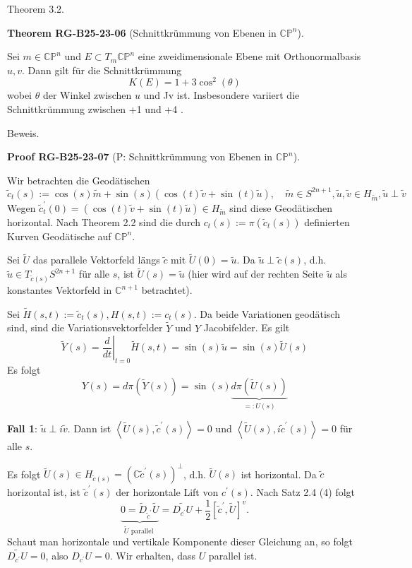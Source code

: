 \documentclass[10pt, letterpaper]{article}
\newcommand{\CustomHeading}[3]{%
  \par\medskip\noindent%
  \textbf{#1 #2} \textnormal{(#3)}.\enskip%
}
\newenvironment{THEO}[2]{\begin{unitbox}\CustomHeading{Theorem}{#1}{#2}}{\end{unitbox}}
\newenvironment{PROOF}[2]{\begin{unitbox}\CustomHeading{Proof}{#1}{#2}}{\end{unitbox}}
\begin{document}
Theorem 3.2. 


\begin{THEO}{RG-B25-23-06}{Schnittkrümmung von Ebenen in $\mathbb{C P}^{n}$}
Sei $m \in \mathbb{C P}^{n}$ und $E \subset T_{m} \mathbb{C P}^{n}$ eine zweidimensionale Ebene mit Orthonormalbasis $u, v$. Dann gilt für die Schnittkrümmung
$$
K(E)=1+3 \cos ^{2}(\theta)
$$
wobei $\theta$ der Winkel zwischen $u$ und Jv ist. Insbesondere variiert die Schnittkrümmung zwischen +1 und +4 .
\end{THEO}



Beweis. 

\begin{PROOF}{RG-B25-23-07}{P: Schnittkrümmung von Ebenen in $\mathbb{C P}^{n}$}
Wir betrachten die Geodätischen
$$\tilde{c}_{t}(s):=\cos (s) \tilde{m}+\sin (s)(\cos (t) \tilde{v}+\sin (t) \tilde{u}), \quad \tilde{m} \in S^{2 n+1}, \tilde{u}, \tilde{v} \in H_{\tilde{m}}, \tilde{u} \perp \tilde{v}$$
Wegen $\tilde{c}_{t}^{\prime}(0)=(\cos (t) \tilde{v}+\sin (t) \tilde{u}) \in H_{\tilde{m}}$ sind diese Geodätischen horizontal. Nach Theorem 2.2 sind die durch $c_{t}(s):=\pi\left(\tilde{c}_{t}(s)\right)$ definierten Kurven Geodätische auf $\mathbb{C P}^{n}$.

Sei $\tilde{U}$ das parallele Vektorfeld längs $\tilde{c}$ mit $\tilde{U}(0)=\tilde{u}$. Da $\tilde{u} \perp \tilde{c}(s)$, d.h. $\tilde{u} \in T_{\tilde{c}(s)} S^{2 n+1}$ für alle $s$, ist $\tilde{U}(s)=\tilde{u}$ (hier wird auf der rechten Seite $\tilde{u}$ als konstantes Vektorfeld in $\mathbb{C}^{n+1}$ betrachtet).

Sei $\tilde{H}(s, t):=\tilde{c}_{t}(s), H(s, t):=c_{t}(s)$. Da beide Variationen geodätisch sind, sind die Variationsvektorfelder $\tilde{Y}$ und $Y$ Jacobifelder. Es gilt
$$
\tilde{Y}(s)=\left.\frac{d}{d t}\right|_{t=0} \tilde{H}(s, t)=\sin (s) \tilde{u}=\sin (s) \tilde{U}(s)
$$
Es folgt
\begin{equation*}
Y(s)=d \pi(\tilde{Y}(s))=\sin (s) \underbrace{d \pi(\tilde{U}(s))}_{=: U(s)}
\end{equation*}


\textbf{Fall 1}: $\tilde{u} \perp i \tilde{v}$. Dann ist $\left\langle\tilde{U}(s), \tilde{c}^{\prime}(s)\right\rangle=0$ und $\left\langle\tilde{U}(s), i \tilde{c}^{\prime}(s)\right\rangle=0$ für alle $s$.

Es folgt $\tilde{U}(s) \in H_{\tilde{c}(s)}=\left(\mathbb{C} \tilde{c}^{\prime}(s)\right)^{\perp}$, d.h. $\tilde{U}(s)$ ist horizontal. Da $\tilde{c}$ horizontal ist, ist $\tilde{c}^{\prime}(s)$ der horizontale Lift von $c^{\prime}(s)$. Nach Satz 2.4 (4) folgt
$$
\underbrace{0=\tilde{D}_{\tilde{c}^{\prime}} \tilde{U}}_{\tilde{U} \text { parallel }}=\widetilde{D_{c^{\prime}} U}+\frac{1}{2}\left[\tilde{c}^{\prime}, \tilde{U}\right]^{v} .
$$
Schaut man horizontale und vertikale Komponente dieser Gleichung an, so folgt $\widetilde{D_{c^{\prime}} U}=0$, also $D_{c^{\prime}} U=0$. Wir erhalten, dass $U$ parallel ist.


\end{PROOF}
\end{document}
